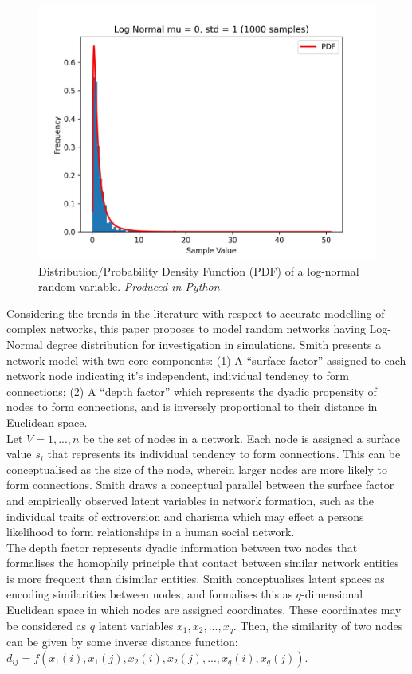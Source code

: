 \documentclass[
	a4paper, %
	10pt, %
	unnumberedsections, %
	twoside, %
]{LTJournalArticle}
\begin{document}
\begin{figure}[H] %
	\includegraphics[width=\linewidth]{Figures/ln/lognormal_dist.jpg}
	\caption{Distribution/Probability Density Function (PDF) of a log-normal random variable. \emph{Produced in Python}}
	\label{fig:lognormal_dist}
\end{figure}

Considering the trends in the literature with respect to accurate modelling of complex networks, this paper proposes to model random networks having Log-Normal degree distribution for investigation in simulations. Smith presents a network model with two core components: (1) A ``surface factor'' assigned to each network node indicating it's independent, individual tendency to form connections; (2) A ``depth factor'' which represents the dyadic propensity of nodes to form connections, and is inversely proportional to their distance in Euclidean space. \\ 

Let \(V = {1, ..., n} \) be the set of nodes in a network. Each node is assigned a surface value  \( s_{i} \) that represents its individual tendency to form connections. This can be conceptualised as the size of the node, wherein larger nodes are more likely to form connections. Smith draws a conceptual parallel between the surface factor and empirically observed latent variables in network formation, such as the individual traits of extroversion and charisma which may effect a persons likelihood to form relationships in a human social network. \\

The depth factor represents dyadic information between two nodes that formalises the homophily principle that contact between similar network entities is more frequent than disimilar entities. Smith conceptualises latent spaces as encoding similarities between nodes, and formalises this as \(q\)-dimensional Euclidean space in which nodes are assigned coordinates. These coordinates may be considered as \(q\) latent variables \(x_{1}, x_{2}, ..., x_{q}\). Then, the similarity of two nodes can be given by some inverse distance function: \(d_{ij} = f(x_{1}(i), x_{1}(j), x_{2}(i), x_{2}(j), ..., x_{q}(i), x_{q}(j)) \). \\
\end{document}
